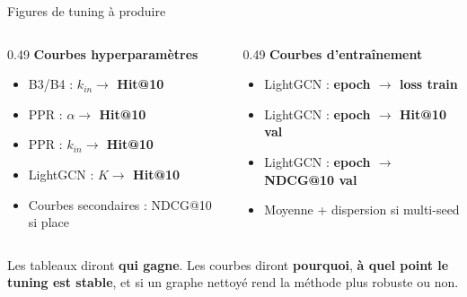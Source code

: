 \documentclass[aspectratio=169,10pt]{beamer}
\newcommand{\keybox}[1]{%
  \begin{center}
  \colorbox{accentsoft}{\parbox{0.92\linewidth}{\centering #1}}
  \end{center}}
\begin{document}
\begin{frame}{Figures de tuning à produire}
  \footnotesize
  \begin{columns}[T,onlytextwidth]
    \begin{column}{0.49\textwidth}
      \textbf{Courbes hyperparamètres}
      \begin{itemize}\setlength{\itemsep}{0.28em}
        \item B3/B4 : \textbf{$k_{in} \to$ Hit@10}
        \item PPR : \textbf{$\alpha \to$ Hit@10}
        \item PPR : \textbf{$k_{in} \to$ Hit@10}
        \item LightGCN : \textbf{$K \to$ Hit@10}
        \item Courbes secondaires : NDCG@10 si place
      \end{itemize}
    \end{column}
    \begin{column}{0.49\textwidth}
      \textbf{Courbes d'entraînement}
      \begin{itemize}\setlength{\itemsep}{0.28em}
        \item LightGCN : \textbf{epoch $\to$ loss train}
        \item LightGCN : \textbf{epoch $\to$ Hit@10 val}
        \item LightGCN : \textbf{epoch $\to$ NDCG@10 val}
        \item Moyenne + dispersion si multi-seed
      \end{itemize}
    \end{column}
  \end{columns}

  \vspace{0.55em}
  \keybox{\scriptsize Les tableaux diront \textbf{qui gagne}. Les courbes diront
  \textbf{pourquoi}, \textbf{à quel point le tuning est stable}, et si un graphe
  nettoyé rend la méthode plus robuste ou non.}
\end{frame}
\end{document}
